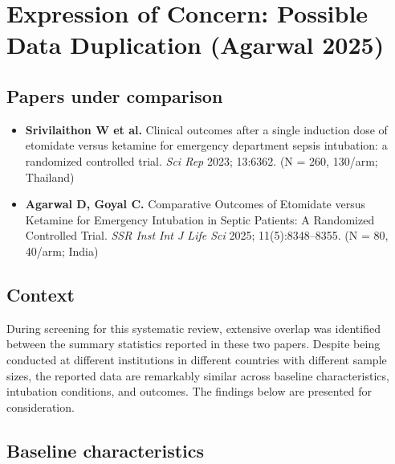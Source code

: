 \documentclass[11pt]{article}
\begin{document}
\newpage

\section{Expression of Concern: Possible Data Duplication (Agarwal 2025)}
\label{sec:data-duplication}

\subsection{Papers under comparison}

\begin{itemize}
\item \textbf{Srivilaithon W et al.} Clinical outcomes after a single induction dose of etomidate versus ketamine for emergency department sepsis intubation: a randomized controlled trial. \textit{Sci Rep} 2023; 13:6362. (N = 260, 130/arm; Thailand)
\item \textbf{Agarwal D, Goyal C.} Comparative Outcomes of Etomidate versus Ketamine for Emergency Intubation in Septic Patients: A Randomized Controlled Trial. \textit{SSR Inst Int J Life Sci} 2025; 11(5):8348--8355. (N = 80, 40/arm; India)
\end{itemize}

\subsection{Context}

During screening for this systematic review, extensive overlap was identified between the summary statistics reported in these two papers. Despite being conducted at different institutions in different countries with different sample sizes, the reported data are remarkably similar across baseline characteristics, intubation conditions, and outcomes. The findings below are presented for consideration.

\subsection{Baseline characteristics}
\end{document}
